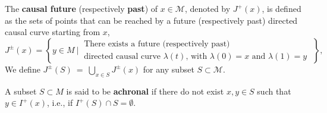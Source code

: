 \documentclass[11pt]{book}
\newcommand{\com}[1]{{\color{red}\bf #1}}
\newcommand{\Mcal}{\mathcal{M}}
\newcommand{\Rbb}{\mathbb{R}}
\newcommand{\dsf}{\mathsf{d}}
\theoremstyle{break}
\newtheorem{definition}{Definition}[chapter]
\begin{document}
%
%
%
%



%
The \textbf{causal future} (respectively \textbf{past}) of $x \in \Mcal$, denoted by $J^{+}(x)$, is defined as the sets of points that can be reached by a future (respectively past) directed causal curve starting from $x$,
%
\begin{equation*}
J^{\pm}(x) = \left\{ y \in M \ \bigg| \ \begin{array}{l} \text{There exists a future (respectively past)} \\ \text{directed causal curve $\lambda(t)$, with $\lambda(0)=x$ and $\lambda(1)=y$} \end{array} \; \right\},
\end{equation*}
We define $J^{\pm}(S) \ = \ \bigcup_{x \in S} J^{\pm}(x)$ for any subset $S \subset \Mcal$.
%










A subset $S \subset M$ is said to be \textbf{achronal} if there do not exist $x, y \in S$ such that $y \in I^{+}(x)$, i.e., if $I^{+}(S) \cap S = \emptyset$. 
\end{document}
